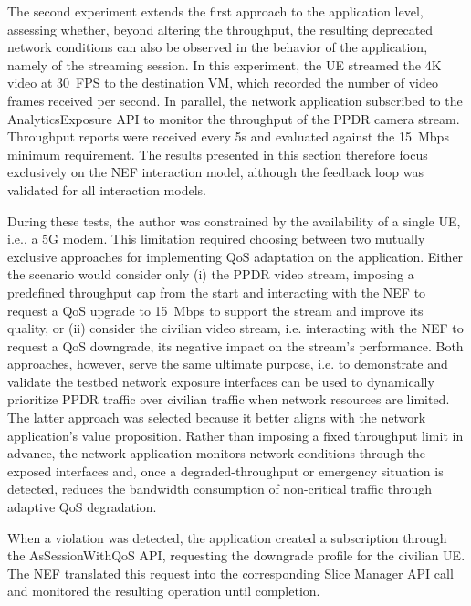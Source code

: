 The second experiment extends the first approach to the application level, assessing whether, beyond altering the throughput, the resulting deprecated network conditions can also be observed in the behavior of the application, namely of the streaming session. In this experiment, the \acs{UE} streamed the 4K video at 30~\acs{FPS} to the destination \acs{VM}, which recorded the number of video frames received per second. In parallel, the network application subscribed to the AnalyticsExposure \acs{API} to monitor the throughput of the \acs{PPDR} camera stream. Throughput reports were received every 5s and evaluated against the 15~Mbps minimum requirement. The results presented in this section therefore focus exclusively on the \acs{NEF} interaction model, although the feedback loop was validated for all interaction models.

During these tests, the author was constrained by the availability of a single \acs{UE}, i.e., a \acs{5G} modem. This limitation required choosing between two mutually exclusive approaches for implementing \acs{QoS} adaptation on the application. Either the scenario would consider only (i) the \acs{PPDR} video stream, imposing a predefined throughput cap from the start and interacting with the \acs{NEF} to request a \acs{QoS} upgrade to 15~Mbps to support the stream and improve its quality, or (ii) consider the civilian video stream, i.e. interacting with the \acs{NEF} to request a \acs{QoS} downgrade, its negative impact on the stream's performance. Both approaches, however, serve the same ultimate purpose, i.e. to demonstrate and validate the testbed network exposure interfaces can be used to dynamically prioritize \acs{PPDR} traffic over civilian traffic when network resources are limited. The latter approach was selected because it better aligns with the network application's value proposition. Rather than imposing a fixed throughput limit in advance, the network application monitors network conditions through the exposed interfaces and, once a degraded-throughput or emergency situation is detected, reduces the bandwidth consumption of non-critical traffic through adaptive \acs{QoS} degradation.

When a violation was detected, the application created a subscription through the AsSessionWithQoS \acs{API}, requesting the downgrade profile for the civilian \acs{UE}. The \acs{NEF} translated this request into the corresponding Slice Manager \acs{API} call and monitored the resulting operation until completion.

